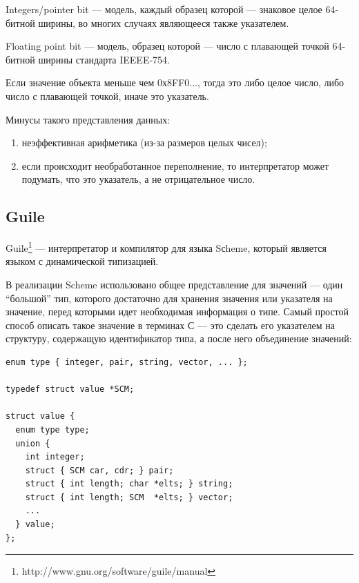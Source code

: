 Integers/pointer bit --- модель, каждый образец которой --- знаковое целое 64-битной ширины, 
во многих случаях являющееся также указателем.

Floating point bit --- модель, образец которой --- число с плавающей точкой 64-битной ширины стандарта IEEEE-754.

Если значение объекта меньше чем 0х8FF0..., тогда это либо целое число, либо число с плавающей точкой,
иначе это указатель.

Минусы такого представления данных: 
\begin{enumerate}
\item неэффективная арифметика (из-за размеров целых чисел);
\item если происходит необработанное переполнение, то интерпретатор может 
подумать, что это указатель, а не отрицательное число.
\end{enumerate}

\subsection {Guile}

Guile\footnote{http://www.gnu.org/software/guile/manual} --- интерпретатор и компилятор для языка Sсheme, который
является языком с динамической типизацией.



В реализации Scheme использовано общее представление для значений ---
один ``большой'' тип, которого достаточно для хранения значения или указателя на значение,
перед которыми идет необходимая информация о типе. Самый простой способ описать такое значение в терминах С --- 
это сделать его указателем на структуру, содержащую идентификатор типа, а после него объединение 
значений:

\begin{lstlisting}
enum type { integer, pair, string, vector, ... };
  
typedef struct value *SCM;
  
struct value {
  enum type type;
  union {
    int integer;
    struct { SCM car, cdr; } pair;
    struct { int length; char *elts; } string;
    struct { int length; SCM  *elts; } vector;
    ...
  } value;
};
\end{lstlisting}

